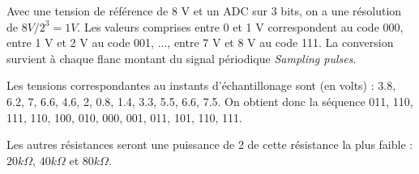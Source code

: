 \documentclass{../../template/tp}
\begin{document}
{
	Avec une tension de référence de 8 V et un ADC sur 3 bits, on a une résolution de $8V/2^3 = 1 V$. Les valeurs comprises entre 0 et 1 V correspondent au code 000, entre 1 V et 2 V au code 001, ..., entre 7 V et 8 V au code 111.
	La conversion survient à chaque flanc montant du signal périodique \textit{Sampling pulses}.

	Les tensions correspondantes au instants d'échantillonage sont (en volts) : 3.8, 6.2, 7, 6.6, 4.6, 2, 0.8, 1.4, 3.3, 5.5, 6.6, 7.5.
	On obtient donc la séquence 011, 110, 111, 110, 100, 010, 000, 001, 011, 101, 110, 111.
}

{
	Les autres résistances seront une puissance de 2 de cette résistance la plus faible : $20k\Omega$, $40k\Omega$ et $80k\Omega$.
}
\end{document}
